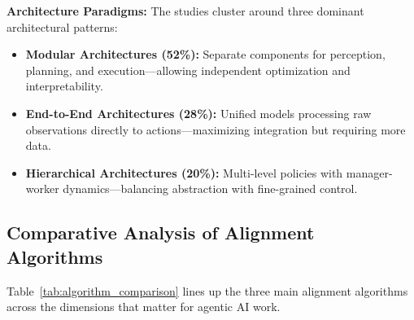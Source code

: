 \documentclass[12pt,a4paper]{report}
\theoremstyle{definition}
\begin{document}
\noindent\textbf{Architecture Paradigms:} The studies cluster around three dominant architectural patterns:
\begin{itemize}
    \item \textbf{Modular Architectures (52\%):} Separate components for perception, planning, and execution---allowing independent optimization and interpretability.
    \item \textbf{End-to-End Architectures (28\%):} Unified models processing raw observations directly to actions---maximizing integration but requiring more data.
    \item \textbf{Hierarchical Architectures (20\%):} Multi-level policies with manager-worker dynamics---balancing abstraction with fine-grained control.
\end{itemize}

\subsection{Comparative Analysis of Alignment Algorithms}
Table~\ref{tab:algorithm_comparison} lines up the three main alignment algorithms across the dimensions that matter for agentic AI work.
\end{document}
